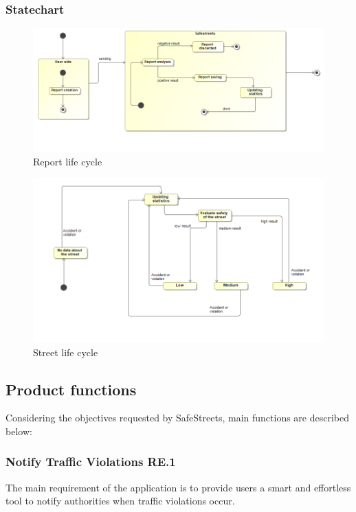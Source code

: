 \subsubsection{Statechart}
\begin{figure}[H]
	\centering
	\includegraphics[width=1.12\linewidth]{Images/ReportLifeCycle.png}
	\caption{Report life cycle}
\end{figure}
\begin{figure}[H]
	\centering
	\includegraphics[width=1.12\linewidth]{Images/StreetLifeCycle.png}
	\caption{Street life cycle}
\end{figure}
\newpage

\subsection{Product functions}
Considering the objectives requested by SafeStreets, main functions are described below:

\subsubsection{Notify Traffic Violations RE.1}
The main requirement of the application is to provide users a smart and effortless tool to notify authorities when traffic violations occur.

